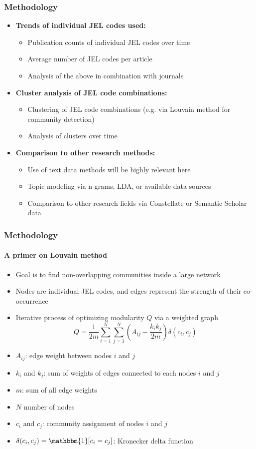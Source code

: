 \documentclass[aspectratio=1610]{beamer}
\begin{document}
\begin{frame}
	\frametitle{Methodology}
	\begin{itemize}
		\item \textbf{Trends of individual JEL codes used:}
		\begin{itemize}
			\item Publication counts of individual JEL codes over time
			\item Average number of JEL codes per article
			\item Analysis of the above in combination with journals
		\end{itemize}

		\item \textbf{Cluster analysis of JEL code combinations:}
		\begin{itemize}
			\item Clustering of JEL code combinations (e.g. via Louvain method for community detection)
			\item Analysis of clusters over time
		\end{itemize}

		\item \textbf{Comparison to other research methods:}
		\begin{itemize}
			\item Use of text data methods will be highly relevant here
			\item Topic modeling via n-grams, LDA, or available data sources
			\item Comparison to other research fields via Constellate or Semantic Scholar data
		\end{itemize}
	\end{itemize}
\end{frame}

\begin{frame}
	\frametitle{Methodology}
	\framesubtitle{A primer on Louvain method}
	\begin{itemize}
		\item Goal is to find non-overlapping communities inside a large network
		\item Nodes are individual JEL codes, and edges represent the strength of their co-occurrence
		\item Iterative process of optimizing modularity $Q$ via a weighted graph
		\begin{equation}
			Q = \frac{1}{2m} \sum_{i=1}^N \sum_{j=1}^N \left( A_{ij} - \frac{k_i k_j}{2m} \right) \delta(c_i, c_j)
		\end{equation}
		\item $A_{ij}$: edge weight between nodes $i$ and $j$
		\item $k_i$ and $k_j$: sum of weights of edges connected to each nodes $i$ and $j$ 
		\item $m$: sum of all edge weights
		\item $N$ number of nodes
		\item $c_i$ and $c_j$: community assignment of nodes $i$ and $j$
		\item $\delta(c_i, c_j) = \mathbbm{1}[c_i = c_j]$: Kronecker delta function
	\end{itemize}
\end{frame}
\end{document}
